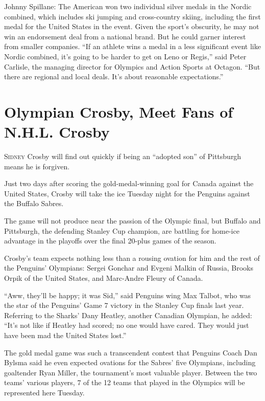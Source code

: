 ﻿\documentclass[12pt]{article}
\begin{document}
Johnny Spillane: The American won two individual silver medals in the Nordic combined, which
includes ski jumping and cross-country skiing, including the first medal for the United States in
the event. Given the sport's obscurity, he may not win an endorsement deal from a national brand.
But he could garner interest from smaller companies. ``If an athlete wins a medal in a less
significant event like Nordic combined, it's going to be harder to get on Leno or Regis,'' said
Peter Carlisle, the managing director for Olympics and Action Sports at Octagon. ``But there are
regional and local deals. It's about reasonable expectations.''

\section{Olympian Crosby, Meet Fans of N.H.L. Crosby}

\lettrine{S}{idney} Crosby will find out quickly if being an ``adopted son''
of Pittsburgh means he is forgiven.

Just two days after scoring the gold-medal-winning goal for Canada against the United States, Crosby
will take the ice Tuesday night for the Penguins against the Buffalo Sabres.

The game will not produce near the passion of the Olympic final, but Buffalo and Pittsburgh, the
defending Stanley Cup champion, are battling for home-ice advantage in the playoffs over the final
20-plus games of the season.


Crosby's team expects nothing less than a rousing ovation for him and the rest of the Penguins'
Olympians: Sergei Gonchar and Evgeni Malkin of Russia, Brooks Orpik of the United States, and
Marc-Andre Fleury of Canada.

``Aww, they'll be happy; it was Sid,'' said Penguins wing Max Talbot, who was the star of the
Penguins' Game 7 victory in the Stanley Cup finals last year. Referring to the Sharks' Dany Heatley,
another Canadian Olympian, he added: ``It's not like if Heatley had scored; no one would have cared.
They would just have been mad the United States lost.''

The gold medal game was such a transcendent contest that Penguins Coach Dan Bylsma said he even
expected ovations for the Sabres' five Olympians, including goaltender Ryan Miller, the tournament's
most valuable player. Between the two teams' various players, 7 of the 12 teams that played in the
Olympics will be represented here Tuesday.
\end{document}
